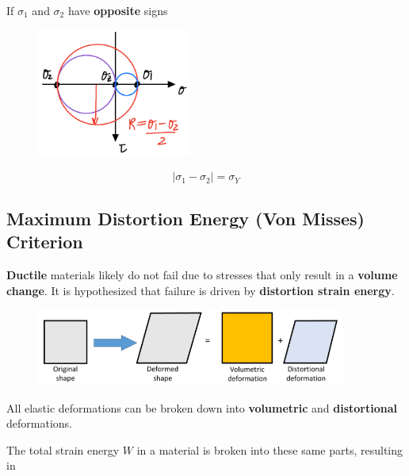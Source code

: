 \noindent If $\sigma_1$ and $\sigma_2$ have \textbf{opposite} signs

\begin{figure}[!h]
\centering
\includegraphics[angle=0, width=2in]{Failure Theories-Figures/TrescaOppositeSigns.png}
\vspace{-2mm}
\caption{\small {}}
\vspace{-3mm}
\label{Fig:TrescaOpp}
\end{figure}

\[|\sigma_1 - \sigma_2| = \sigma_Y\]

\subsection{Maximum Distortion Energy (Von Misses) Criterion}

\textbf{Ductile} materials likely do not fail due to stresses that only result in a \textbf{volume change}. It is hypothesized that failure is driven by \textbf{distortion strain energy}.

\begin{figure}[!h]
\centering
\includegraphics[angle=0, width=4in]{Failure Theories-Figures/VonMises.png}
\vspace{-2mm}
\caption{\small {}}
\vspace{-3mm}
\label{Fig:VonMises}
\end{figure}

\noindent All elastic deformations can be broken down into \textbf{volumetric} and \textbf{distortional} deformations. 

\vspace{5pt}

\noindent The total strain energy $W$ in a material is broken into these same parts, resulting in

